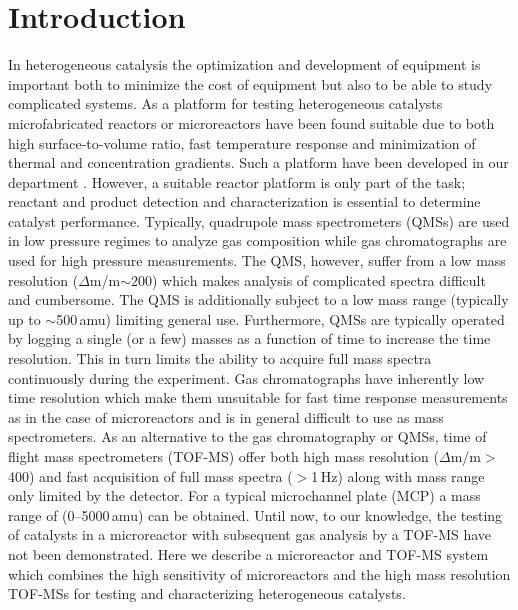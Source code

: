 \documentclass[aip,rsi]{revtex4-1}
\begin{document}
\pacs{}%

\maketitle %

\section{Introduction}
In heterogeneous catalysis the optimization and development of equipment is important both to minimize the cost of equipment but also to be able to study complicated systems. As a platform for testing heterogeneous catalysts microfabricated reactors or microreactors have been found suitable due to both high surface-to-volume ratio, fast temperature response and minimization of thermal and concentration gradients. Such a platform have been developed in our department \cite{Henriksen2009}. However, a suitable reactor platform is only part of the task; reactant and product detection and characterization is essential to determine catalyst performance. Typically, quadrupole mass spectrometers (QMSs) are used in low pressure regimes to analyze gas composition while gas chromatographs are used for high pressure measurements. The QMS, however, suffer from a low mass resolution ($\Delta$m/m$\sim$200) which makes analysis of complicated spectra difficult and cumbersome. The QMS is additionally subject to a low mass range (typically up to $\sim$500\,amu) limiting general use. Furthermore, QMSs are typically operated by logging a single (or a few) masses as a function of time to increase the time resolution. This in turn limits the ability to acquire full mass spectra continuously during the experiment. Gas chromatographs have inherently low time resolution which make them unsuitable for fast time response measurements as in the case of microreactors and is in general difficult to use as mass spectrometers. As an alternative to the gas chromatography or QMSs, time of flight mass spectrometers (TOF-MS) offer both high mass resolution ($\Delta$m/m$>$400) and fast acquisition of full mass spectra ($>$1\,Hz) along with mass range only limited by the detector. For a typical microchannel plate (MCP) a mass range of (0--5000\,amu) can be obtained. Until now, to our knowledge, the testing of catalysts in a microreactor with subsequent gas analysis by a TOF-MS have not been demonstrated. Here we describe a microreactor and TOF-MS system which combines the high sensitivity of microreactors and the high mass resolution TOF-MSs for testing and characterizing heterogeneous catalysts.
\end{document}
